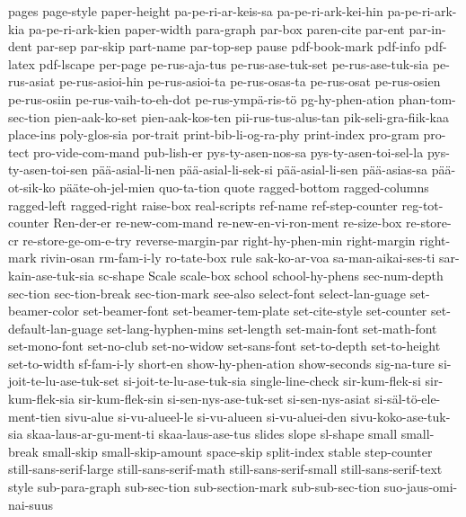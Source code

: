 {  pages
  page-style
  paper-height
  pa-pe-ri-ar-keis-sa
  pa-pe-ri-ark-kei-hin
  pa-pe-ri-ark-kia
  pa-pe-ri-ark-kien
  paper-width
  para-graph
  par-box
  paren-cite
  par-ent
  par-in-dent
  par-sep
  par-skip
  part-name
  par-top-sep
  pause
  pdf-book-mark
  pdf-info
  pdf-latex
  pdf-lscape
  per-page
  pe-rus-aja-tus
  pe-rus-ase-tuk-set
  pe-rus-ase-tuk-sia
  pe-rus-asiat
  pe-rus-asioi-hin
  pe-rus-asioi-ta
  pe-rus-osas-ta
  pe-rus-osat
  pe-rus-osien
  pe-rus-osiin
  pe-rus-vaih-to-eh-dot
  pe-rus-ympä-ris-tö
  pg-hy-phen-ation
  phan-tom-sec-tion
  pien-aak-ko-set
  pien-aak-kos-ten
  pii-rus-tus-alus-tan
  pik-seli-gra-fiik-kaa
  place-ins
  poly-glos-sia
  por-trait
  print-bib-li-og-ra-phy
  print-index
  pro-gram
  pro-tect
  pro-vide-com-mand
  pub-lish-er
  pys-ty-asen-nos-sa
  pys-ty-asen-toi-sel-la
  pys-ty-asen-toi-sen
  pää-asial-li-nen
  pää-asial-li-sek-si
  pää-asial-li-sen
  pää-asias-sa
  pää-ot-sik-ko
  pääte-oh-jel-mien
  quo-ta-tion
  quote
  ragged-bottom
  ragged-columns
  ragged-left
  ragged-right
  raise-box
  real-scripts
  ref-name
  ref-step-counter
  reg-tot-counter
  Ren-der-er
  re-new-com-mand
  re-new-en-vi-ron-ment
  re-size-box
  re-store-cr
  re-store-ge-om-e-try
  reverse-margin-par
  right-hy-phen-min
  right-margin
  right-mark
  rivin-osan
  rm-fam-i-ly
  ro-tate-box
  rule
  sak-ko-ar-voa
  sa-man-aikai-ses-ti
  sar-kain-ase-tuk-sia
  sc-shape
  Scale
  scale-box
  school
  school-hy-phens
  sec-num-depth
  sec-tion
  sec-tion-break
  sec-tion-mark
  see-also
  select-font
  select-lan-guage
  set-beamer-color
  set-beamer-font
  set-beamer-tem-plate
  set-cite-style
  set-counter
  set-default-lan-guage
  set-lang-hyphen-mins
  set-length
  set-main-font
  set-math-font
  set-mono-font
  set-no-club
  set-no-widow
  set-sans-font
  set-to-depth
  set-to-height
  set-to-width
  sf-fam-i-ly
  short-en
  show-hy-phen-ation
  show-seconds
  sig-na-ture
  si-joit-te-lu-ase-tuk-set
  si-joit-te-lu-ase-tuk-sia
  single-line-check
  sir-kum-flek-si
  sir-kum-flek-sia
  sir-kum-flek-sin
  si-sen-nys-ase-tuk-set
  si-sen-nys-asiat
  si-säl-tö-ele-ment-tien
  sivu-alue
  si-vu-alueel-le
  si-vu-alueen
  si-vu-aluei-den
  sivu-koko-ase-tuk-sia
  skaa-laus-ar-gu-ment-ti
  skaa-laus-ase-tus
  slides
  slope
  sl-shape
  small
  small-break
  small-skip
  small-skip-amount
  space-skip
  split-index
  stable
  step-counter
  still-sans-serif-large
  still-sans-serif-math
  still-sans-serif-small
  still-sans-serif-text
  style
  sub-para-graph
  sub-sec-tion
  sub-section-mark
  sub-sub-sec-tion
  suo-jaus-omi-nai-suus
}
